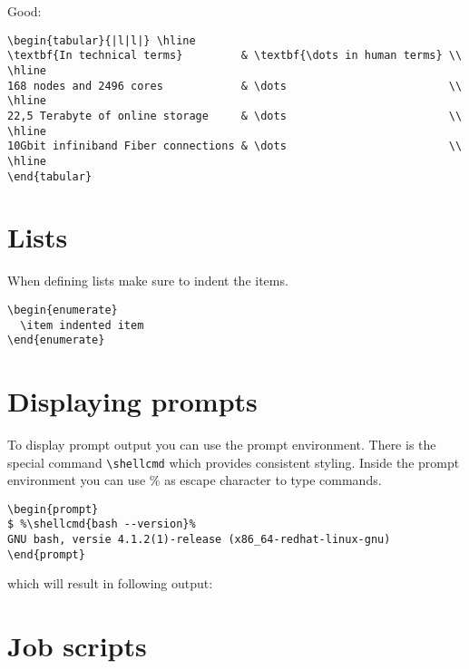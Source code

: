 \documentclass[11pt,a4paper]{article}
\newcommand{\shellcmd}[1]{\textbf{\texttt{\footnotesize #1}\\}}
\begin{document}
Good:
\begin{verbatim}
\begin{tabular}{|l|l|} \hline
\textbf{In technical terms}         & \textbf{\dots in human terms} \\ \hline
168 nodes and 2496 cores            & \dots                         \\ \hline
22,5 Terabyte of online storage     & \dots                         \\ \hline
10Gbit infiniband Fiber connections & \dots                         \\ \hline
\end{tabular}
\end{verbatim}

\section{Lists}
\label{sec:lists}

When defining lists make sure to indent the items.

\begin{verbatim}
\begin{enumerate}
  \item indented item
\end{enumerate}
\end{verbatim}

\section{Displaying prompts}
\label{sec:displaying-prompts}

To display prompt output you can use the prompt environment. There is the
special command \texttt{\textbackslash{}shellcmd{}} which provides consistent
styling. Inside the prompt environment you can use \% as escape character to
type commands.

\begin{verbatim}
\begin{prompt}
$ %\shellcmd{bash --version}%
GNU bash, versie 4.1.2(1)-release (x86_64-redhat-linux-gnu)
\end{prompt}
\end{verbatim}

which will result in following output:

\section{Job scripts}
\label{sec:job-scripts}
\end{document}
